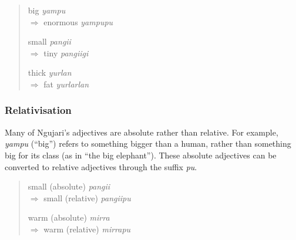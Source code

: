 \begin{quote}
\begin{multicols}{3}
big \textit{yampu}\\
$\Rightarrow$ enormous \textit{yampupu}

small \textit{pangii}\\
$\Rightarrow$ tiny \textit{pangiigi}

thick \textit{yurlan}\\
$\Rightarrow$ fat \textit{yurlarlan}
\end{multicols}
\end{quote}

\subsubsection{Relativisation}

Many of Ngujari's adjectives are absolute rather than relative. For example,
\textit{yampu} (``big'') refers to something bigger than a human, rather than
something big for its class (as in ``the big elephant''). These absolute
adjectives can be converted to relative adjectives through the suffix
\textit{pu}.

\begin{quote}
\begin{multicols}{2}
small (absolute) \textit{pangii}\\
$\Rightarrow$ small (relative) \textit{pangiipu}

warm (absolute) \textit{mirra}\\
$\Rightarrow$ warm (relative) \textit{mirrapu}
\end{multicols}
\end{quote}
